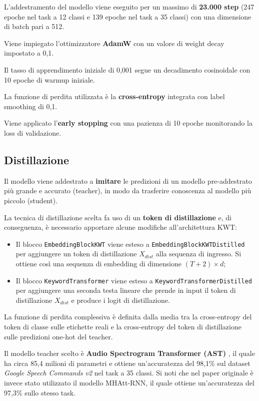 \documentclass[11pt, a4paper]{article}
\begin{document}
L'addestramento del modello viene eseguito per un massimo di \textbf{23.000 step} (247 epoche nel task a 12 classi e 139 epoche nel task a 35 classi) con una dimensione di batch pari a 512.

Viene impiegato l'ottimizzatore \textbf{AdamW} con un valore di weight decay impostato a 0,1.

Il tasso di apprendimento iniziale di 0,001 segue un decadimento cosinoidale con 10 epoche di warmup iniziale.

La funzione di perdita utilizzata è la \textbf{cross-entropy} integrata con label smoothing di 0,1.

Viene applicato l'\textbf{early stopping} con una pazienza di 10 epoche monitorando la loss di validazione.

\subsection{Distillazione}

Il modello viene addestrato a \textbf{imitare} le predizioni di un modello pre-addestrato più grande e accurato (teacher), in modo da trasferire conoscenza al modello più piccolo (student).

La tecnica di distillazione scelta fa uso di un \textbf{token di distillazione} e, di conseguenza, è necessario apportare alcune modifiche all'architettura KWT:
\begin{itemize}
  \item Il blocco \texttt{EmbeddingBlockKWT} viene esteso a \texttt{EmbeddingBlockKWTDistilled} per aggiungere un token di distillazione $X_{dist}$ alla sequenza di ingresso. Si ottiene così una sequenza di embedding di dimensione $(T+2) \times d$;
  \item Il blocco \texttt{KeywordTransformer} viene esteso a \texttt{KeywordTransformerDistilled} per aggiungere una seconda testa lineare che prende in input il token di distillazione $X_{dist}$ e produce i logit di distillazione.
\end{itemize}

La funzione di perdita complessiva è definita dalla media tra la cross-entropy del token di classe sulle etichette reali e la cross-entropy del token di distillazione sulle predizioni one-hot del teacher.

Il modello teacher scelto è \textbf{Audio Spectrogram Transformer (AST)} \cite{gong2021astaudiospectrogramtransformer}, il quale ha circa 85,4 milioni di parametri e ottiene un'accuratezza del 98,1\% sul dataset \textit{Google Speech Commands v2} nel task a 35 classi. Si noti che nel paper originale è invece stato utilizzato il modello MHAtt-RNN, il quale ottiene un'accuratezza del 97,3\% sullo stesso task.
\end{document}
